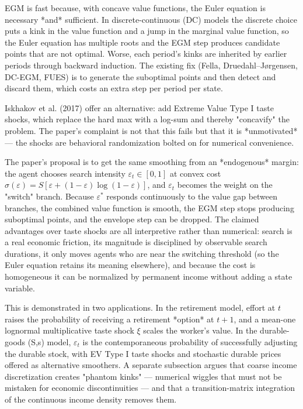 EGM is fast because, with concave value functions, the Euler equation is necessary *and* sufficient. In discrete-continuous (DC) models the discrete choice puts a kink in the value function and a jump in the marginal value function, so the Euler equation has multiple roots and the EGM step produces candidate points that are not optimal. Worse, each period's kinks are inherited by earlier periods through backward induction. The existing fix (Fella, Druedahl–Jørgensen, DC-EGM, FUES) is to generate the suboptimal points and then detect and discard them, which costs an extra step per period per state.

Iskhakov et al. (2017) offer an alternative: add Extreme Value Type I taste shocks, which replace the hard max with a log-sum and thereby "concavify" the problem. The paper's complaint is not that this fails but that it is *unmotivated* — the shocks are behavioral randomization bolted on for numerical convenience.

The paper's proposal is to get the same smoothing from an *endogenous* margin: the agent chooses search intensity $\varepsilon_t \in [0,1]$ at convex cost $\sigma(\varepsilon)=S[\varepsilon+(1-\varepsilon)\log(1-\varepsilon)]$, and $\varepsilon_t$ becomes the weight on the "switch" branch. Because $\varepsilon^*$ responds continuously to the value gap between branches, the combined value function is smooth, the EGM step stops producing suboptimal points, and the envelope step can be dropped. The claimed advantages over taste shocks are all interpretive rather than numerical: search is a real economic friction, its magnitude is disciplined by observable search durations, it only moves agents who are near the switching threshold (so the Euler equation retains its meaning elsewhere), and because the cost is homogeneous it can be normalized by permanent income without adding a state variable.

This is demonstrated in two applications. In the retirement model, effort at $t$ raises the probability of receiving a retirement *option* at $t+1$, and a mean-one lognormal multiplicative taste shock $\xi$ scales the worker's value. In the durable-goods (S,s) model, $\varepsilon_t$ is the contemporaneous probability of successfully adjusting the durable stock, with EV Type I taste shocks and stochastic durable prices offered as alternative smoothers. A separate subsection argues that coarse income discretization creates "phantom kinks" — numerical wiggles that must not be mistaken for economic discontinuities — and that a transition-matrix integration of the continuous income density removes them.

